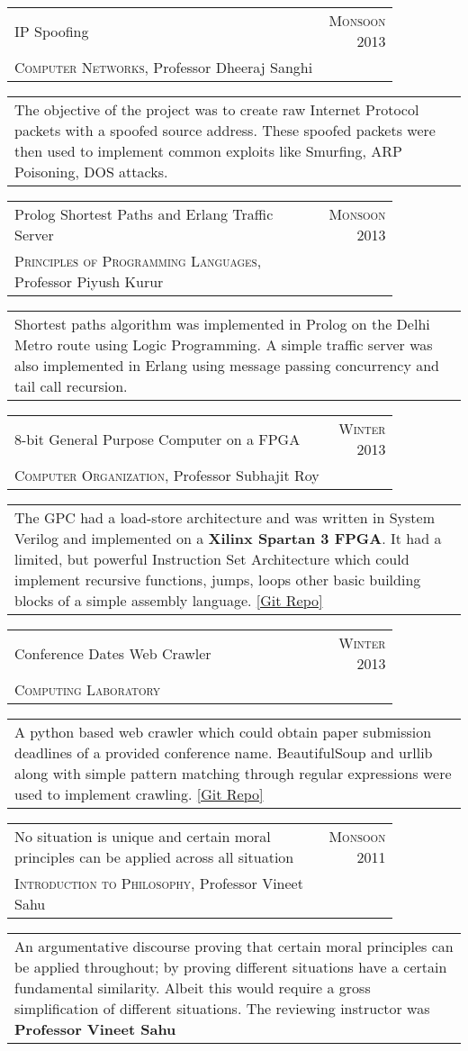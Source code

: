 \documentclass[a4paper,10pt]{article} %
\newcommand{\project}[4]{
    \begin{tabular}{p{0.85\linewidth}r}
        \textcolor{NavyBlue}{#2} & \multicolumn{1}{m{3cm}}{\raggedleft \textsc{#1}}\\
        #3
    \end{tabular}
    \begin{tabular}{p{\linewidth}}
        \footnotesize{#4}
    \end{tabular}
    \vspace{-0.1cm}
}
\begin{document}
\project {Monsoon 2013}
         {IP Spoofing}
         {\textsc{Computer Networks}, Professor Dheeraj Sanghi}
         {The objective of the project was to create raw Internet Protocol packets with a spoofed source
          address. These spoofed packets were then used to implement common exploits like Smurfing,
          ARP Poisoning, DOS attacks.}

\project {Monsoon 2013}
         {Prolog Shortest Paths and Erlang Traffic Server}
         {\textsc{Principles of Programming Languages}, Professor Piyush Kurur}
         {Shortest paths algorithm was implemented in Prolog on the Delhi Metro route
          using Logic Programming. A simple traffic server was also implemented in Erlang
          using message passing concurrency and tail call recursion.}

\project {Winter 2013}
         {8-bit General Purpose Computer on a FPGA}
         {\textsc{Computer Organization}, Professor Subhajit Roy}
         {The GPC had a load-store architecture and was written in System Verilog and
          implemented on a \textbf{Xilinx Spartan 3 FPGA}. It had a limited, but powerful
          Instruction Set Architecture which could implement recursive functions, jumps,
          loops  other basic building blocks of a simple assembly language.
          \href{https://github.com/srijanshetty/220_y11} {[Git Repo]}}

\project {Winter 2013}
         {Conference Dates Web Crawler}
         {\textsc{Computing Laboratory}}
         {A python based web crawler which could obtain paper submission
          deadlines of a provided conference name.  BeautifulSoup and urllib along
          with simple pattern matching through regular expressions were used to implement crawling.
          \href{https://github.com/srijanshetty/crawler} {[Git Repo]}}

\project {Monsoon 2011}
         {No situation is unique and certain moral principles can be applied across all situation}
         {\textsc{Introduction to Philosophy}, Professor Vineet Sahu}
         {An argumentative discourse proving that certain moral principles
          can be applied throughout; by proving different situations have a certain
          fundamental similarity.  Albeit this would require a gross simplification of
          different situations.  The reviewing instructor was \textbf{Professor Vineet Sahu}}

\end{document}
